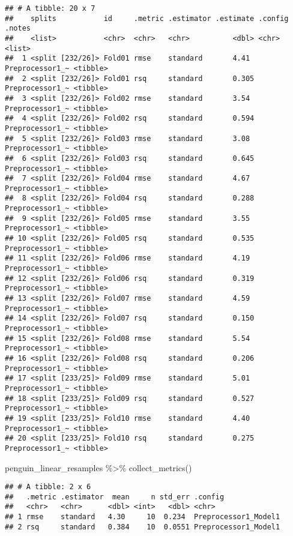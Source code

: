 \documentclass[
]{article}
\newenvironment{Shaded}{\begin{snugshade}}{\end{snugshade}}
\newcommand{\FunctionTok}[1]{\textcolor[rgb]{0.00,0.00,0.00}{#1}}
\newcommand{\NormalTok}[1]{#1}
\newcommand{\SpecialCharTok}[1]{\textcolor[rgb]{0.00,0.00,0.00}{#1}}
\begin{document}
\begin{verbatim}
## # A tibble: 20 x 7
##    splits           id     .metric .estimator .estimate .config         .notes  
##    <list>           <chr>  <chr>   <chr>          <dbl> <chr>           <list>  
##  1 <split [232/26]> Fold01 rmse    standard       4.41  Preprocessor1_~ <tibble>
##  2 <split [232/26]> Fold01 rsq     standard       0.305 Preprocessor1_~ <tibble>
##  3 <split [232/26]> Fold02 rmse    standard       3.54  Preprocessor1_~ <tibble>
##  4 <split [232/26]> Fold02 rsq     standard       0.594 Preprocessor1_~ <tibble>
##  5 <split [232/26]> Fold03 rmse    standard       3.08  Preprocessor1_~ <tibble>
##  6 <split [232/26]> Fold03 rsq     standard       0.645 Preprocessor1_~ <tibble>
##  7 <split [232/26]> Fold04 rmse    standard       4.67  Preprocessor1_~ <tibble>
##  8 <split [232/26]> Fold04 rsq     standard       0.288 Preprocessor1_~ <tibble>
##  9 <split [232/26]> Fold05 rmse    standard       3.55  Preprocessor1_~ <tibble>
## 10 <split [232/26]> Fold05 rsq     standard       0.535 Preprocessor1_~ <tibble>
## 11 <split [232/26]> Fold06 rmse    standard       4.19  Preprocessor1_~ <tibble>
## 12 <split [232/26]> Fold06 rsq     standard       0.319 Preprocessor1_~ <tibble>
## 13 <split [232/26]> Fold07 rmse    standard       4.59  Preprocessor1_~ <tibble>
## 14 <split [232/26]> Fold07 rsq     standard       0.150 Preprocessor1_~ <tibble>
## 15 <split [232/26]> Fold08 rmse    standard       5.54  Preprocessor1_~ <tibble>
## 16 <split [232/26]> Fold08 rsq     standard       0.206 Preprocessor1_~ <tibble>
## 17 <split [233/25]> Fold09 rmse    standard       5.01  Preprocessor1_~ <tibble>
## 18 <split [233/25]> Fold09 rsq     standard       0.527 Preprocessor1_~ <tibble>
## 19 <split [233/25]> Fold10 rmse    standard       4.40  Preprocessor1_~ <tibble>
## 20 <split [233/25]> Fold10 rsq     standard       0.275 Preprocessor1_~ <tibble>
\end{verbatim}

\begin{Shaded}
\begin{Highlighting}[]
\NormalTok{penguin\_linear\_resamples }\SpecialCharTok{\%\textgreater{}\%} \FunctionTok{collect\_metrics}\NormalTok{()}
\end{Highlighting}
\end{Shaded}

\begin{verbatim}
## # A tibble: 2 x 6
##   .metric .estimator  mean     n std_err .config             
##   <chr>   <chr>      <dbl> <int>   <dbl> <chr>               
## 1 rmse    standard   4.30     10  0.234  Preprocessor1_Model1
## 2 rsq     standard   0.384    10  0.0551 Preprocessor1_Model1
\end{verbatim}
\end{document}
